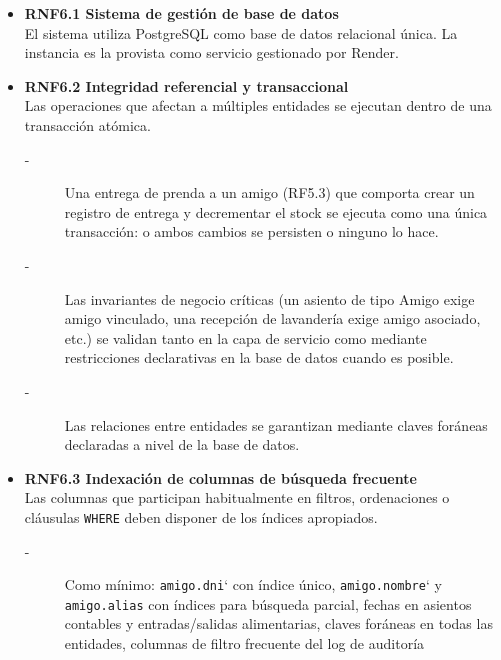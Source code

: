 \begin{itemize}
    \item \textbf{RNF6.1 Sistema de gestión de base de datos} \\
    El sistema utiliza PostgreSQL como base de datos relacional única. La instancia es la 
    provista como servicio gestionado por Render.


    \item \textbf{RNF6.2 Integridad referencial y transaccional} \\
    Las operaciones que afectan a múltiples entidades se ejecutan dentro
    de una transacción atómica.
    \begin{description}
        \item[-] Una entrega de prenda a un amigo (RF5.3) que comporta crear un
        registro de entrega y decrementar el stock se ejecuta como una
        única transacción: o ambos cambios se persisten o ninguno lo hace.
        \item[-] Las invariantes de negocio críticas (un asiento de tipo Amigo
        exige amigo vinculado, una recepción de lavandería exige amigo
        asociado, etc.) se validan tanto en la capa de servicio como
        mediante restricciones declarativas en la base de datos cuando es
        posible.
        \item[-] Las relaciones entre entidades se garantizan mediante claves
        foráneas declaradas a nivel de la base de datos.
    \end{description}


    \item \textbf{RNF6.3 Indexación de columnas de búsqueda frecuente} \\
    Las columnas que participan habitualmente en filtros, ordenaciones
    o cláusulas \texttt{WHERE} deben disponer de los índices apropiados.
    \begin{description}
        \item[-] Como mínimo: \texttt{amigo.dni}` con índice único, \texttt{amigo.nombre}` y
        \texttt{amigo.alias} con índices para búsqueda parcial, fechas en
        asientos contables y entradas/salidas alimentarias, claves foráneas
        en todas las entidades, columnas de filtro frecuente del log de
        auditoría 
    \end{description}



\end{itemize}
